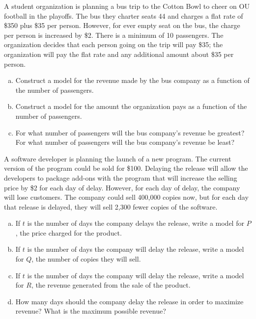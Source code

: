\documentclass[notes]{subfiles}
\begin{document}
		\begin{ex}
			A student organization is planning a bus trip to the Cotton Bowl to cheer on OU football in the playoffs.  The bus they charter seats 44 and charges a flat rate of \$350 plus \$35 per person.  However, for ever empty seat on the bus, the charge per person is increased by \$2.  There is a minimum of 10 passengers.  The organization decides that each person going on the trip will pay \$35; the organization will pay the flat rate and any additional amount about \$35 per person.
			\begin{enumerate}[(a)]
				\item Construct a model for the revenue made by the bus company as a function of the number of passengers.
					
				\item Construct a model for the amount the organization pays as a function of the number of passengers.
					
				\item For what number of passengers will the bus company's revenue be greatest?  For what number of passengers will the bus company's revenue be least?
			\end{enumerate}
		\end{ex}
			\newpage
		\begin{ex} 
			A software developer is planning the launch of a new program.  The current version of the program could be sold for \$100.  Delaying the release will allow the developers to package add-ons with the program that will increase the selling price by \$2 for each day of delay.  However, for each day of delay, the company will lose customers.  The company could sell 400,000 copies now, but for each day that release is delayed, they will sell 2,300 fewer copies of the software.
			\begin{enumerate}[(a)]
				\item If $t$ is the number of days the company delays the release, write a model for $P$, the price charged for the product.
					\vs{1}
					
				\item If $t$ is the number of days the company will delay the release, write a model for $Q$, the number of copies they will sell.
					\vs{1}
					
				\item If $t$ is the number of days the company will delay the release, write a model for $R$, the revenue generated from the sale of the product.
					\vs{1}
					
				\item How many days should the company delay the release in order to maximize revenue?  What is the maximum possible revenue?
					\vs{1}
			\end{enumerate}
		\end{ex}

	\clearpage
\end{document}

